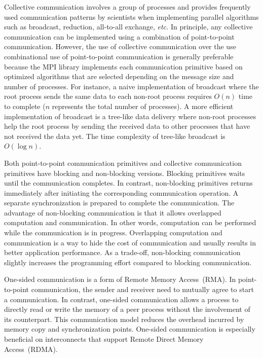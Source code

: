 Collective communication involves a group of processes and provides frequently
used communication patterns by scientists when implementing parallel
algorithms such as broadcast, reduction, all-to-all exchange, \emph{etc.} In
principle, any collective communication can be implemented using a combination
of point-to-point communication. However, the use of collective communication
over the use combinational use of point-to-point communication is generally
preferable because the MPI library implements each communication primitive
based on optimized algorithms that are selected depending on the message size
and number of processes. For instance, a naive implementation of broadcast
where the root process sends the same data to each non-root process requires
$O(n)$ time to complete ($n$ represents the total number of processes). A more
efficient implementation of broadcast is a tree-like data delivery where
non-root processes help the root process by sending the received data to other
processes that have not received the data yet. The time complexity of
tree-like broadcast is $O(\log n)$.

Both point-to-point communication primitives and collective communication
primitives have blocking and non-blocking versions. Blocking primitives waits
until the communication completes. In contrast, non-blocking primitives
returns immediately after initiating the corresponding communication
operation. A separate synchronization is prepared to complete the
communication. The advantage of non-blocking communication is that it allows
overlapped computation and communication. In other words, computation can be
performed while the communication is in progress. Overlapping computation and
communication is a way to hide the cost of communication and usually results
in better application performance. As a trade-off, non-blocking communication
slightly increases the programming effort compared to blocking communication.

One-sided communication is a form of Remote Memory Access~(RMA). In
point-to-point communication, the sender and receiver need to mutually agree
to start a communication. In contrast, one-sided communication allows
a process to directly read or write the memory of a peer process without the
involvement of its counterpart. This communication model reduces the overhead
incurred by memory copy and synchronization points. One-sided communication is
especially beneficial on interconnects that support Remote Direct Memory
Access~(RDMA).

